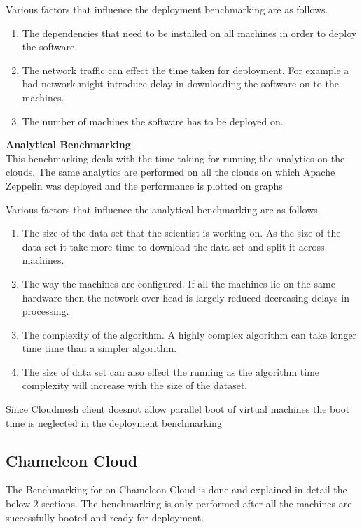 \documentclass[9pt,twocolumn,twoside]{../../styles/osajnl}
\begin{document}
Various factors that influence the deployment benchmarking are as 
follows.
\begin{enumerate}
	\item The dependencies that need to be installed on all machines 
	in order to deploy the software.
	\item The network traffic can effect the time taken for 
	deployment. For example a bad network might introduce delay in 
	downloading the software on to the machines.
	\item The number of machines the software has to be deployed on. 
\end{enumerate}

{\bf\hspace{-3ex} Analytical Benchmarking}
\\
This benchmarking deals with the time taking for running the 
analytics on the clouds. The same analytics are performed on all the 
clouds on which Apache Zeppelin was deployed and the performance is 
plotted on graphs

Various factors that influence the analytical benchmarking are as 
follows.
\begin{enumerate}
	\item The size of the data set that the scientist is working on. 
	As the size of the data set it take more time to download the 
	data set and split it across machines.
	\item The way the machines are configured. If all the machines 
	lie on the same hardware then the network over head is largely 
	reduced decreasing delays in processing.
	\item The complexity of the algorithm. A highly complex algorithm 
	can take longer time time than a simpler algorithm.
	\item The size of data set can also effect the running as the 
	algorithm time complexity will increase with the size of the 
	dataset.
\end{enumerate}

Since Cloudmesh client doesnot allow parallel boot of virtual 
machines the boot time is neglected in the deployment benchmarking

\subsection{Chameleon Cloud}

The Benchmarking for on Chameleon Cloud is done and explained in 
detail the below 2 sections. The benchmarking is only performed after 
all the machines are successfully booted and ready for deployment.
\end{document}
